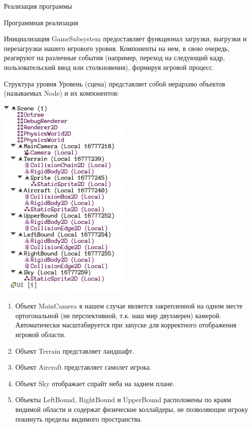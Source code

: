\documentclass[a4paper, 14pt]{extarticle}
\begin{document}
\begin{section}{Реализация программы}
\begin{subsection}{Программная реализация}
\begin{subsubsection}{Инициализация}
GameSubsystem предоставляет функционал загрузки, выгрузки и перезагрузки нашего игрового уровня.
Компоненты на нем, в свою очередь, реагируют на различные события (например, переход на следующий кадр, пользовательский ввод или столкновения), формируя игровой процесс.
\end{subsubsection}

\clearpage
\begin{subsubsection}{Структура уровня}
Уровень (сцена) представляет собой иерархию объектов (называемых Node) и их компонентов:

\includegraphics[width=250]{scene}

\begin{enumerate}
\item Объект MainCamera в нашем случае является закрепленной на одном месте ортогональной (не перспективной, т.к. наш мир двухмерен) камерой.
Автоматически масштабируется при запуске для корректного отображения игровой области.
\item Объект Terrain представляет ландшафт.
\item Объект Aircraft представляет самолет игрока.
\item Объект Sky отображает спрайт неба на заднем плане.
\item Объекты LeftBound, RightBound и UpperBound расположены по краям видимой области и содержат физические коллайдеры, не позволяющие игроку покинуть пределы видимого пространства.
\end{enumerate}


\end{subsubsection}
\end{subsection}
\end{section}
\end{document}
